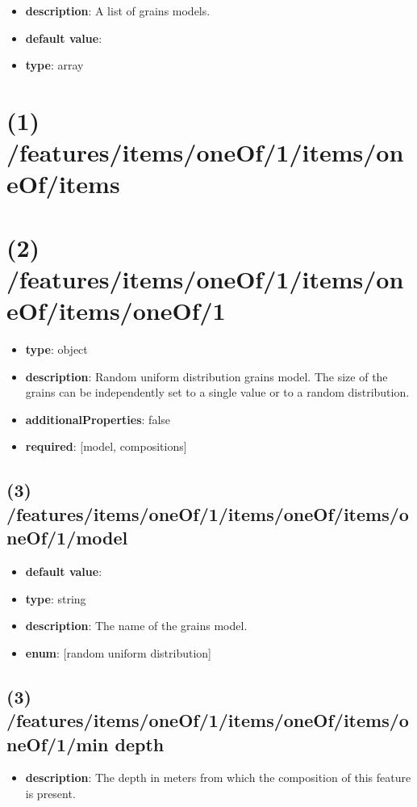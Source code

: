 \begin{itemize}[leftmargin=0em]\item {\bf description}: A list of grains models.
\item {\bf default value}: 
\item {\bf type}: array
\end{itemize}\section{(1) /features/items/oneOf/1/items/oneOf/items}

\section{(2) /features/items/oneOf/1/items/oneOf/items/oneOf/1}
\begin{itemize}[leftmargin=2em]\item {\bf type}: object
\item {\bf description}: Random uniform distribution grains model. The size of the grains can be independently set to a single value or to a random distribution.
\item {\bf additionalProperties}: false
\item {\bf required}: [model, compositions]\end{itemize}
\subsection{(3) /features/items/oneOf/1/items/oneOf/items/oneOf/1/model}
\begin{itemize}[leftmargin=3em]\item {\bf default value}: 
\item {\bf type}: string
\item {\bf description}: The name of the grains model.
\item {\bf enum}: [random uniform distribution]\end{itemize}\subsection{(3) /features/items/oneOf/1/items/oneOf/items/oneOf/1/min depth}
\begin{itemize}[leftmargin=3em]\item {\bf description}: The depth in meters from which the composition of this feature is present.
\end{itemize}
